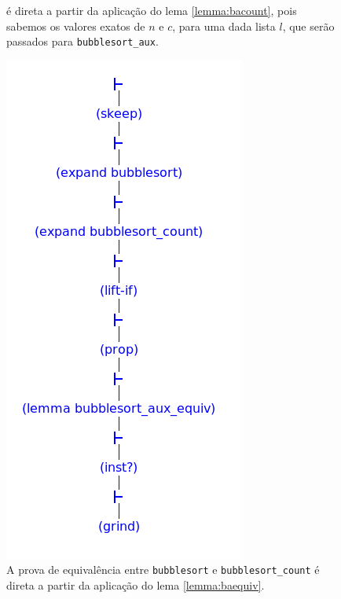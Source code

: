 \begin{figure}[H]
\begin{minipage}{0.475\linewidth}
{    é direta a partir da aplicação do lema \ref{lemma:bacount}, pois sabemos
    os valores exatos de $n$ e $c$, para uma dada lista $l$, que serão passados
    para \texttt{bubblesort\_aux}.}
    \label{fig:bsort1}
\end{minipage}
\hfill
\begin{minipage}{0.475\linewidth}
    \centering
    \includegraphics[width=\linewidth,
    trim={0 0 0 0},clip]{figures/bubblesort-equiv.png}
    \caption{A prova de equivalência entre \texttt{bubblesort} e
    \texttt{bubblesort\_count} é direta a partir da aplicação do
    lema \ref{lemma:baequiv}.}
    \label{fig:bsort2}
\end{minipage}
\end{figure}

